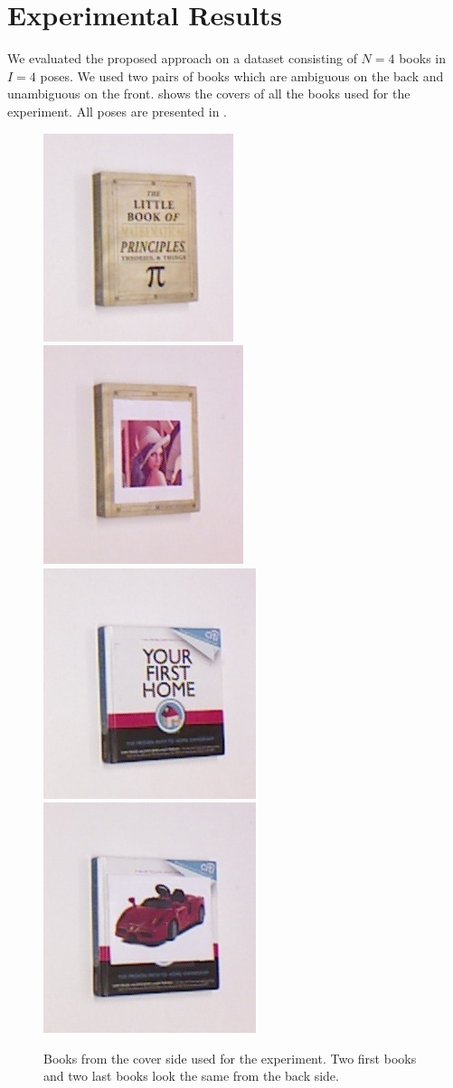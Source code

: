 
\section{Experimental Results}



    We evaluated the proposed approach on a dataset consisting of $N = 4$ books in $I = 4$ poses. We used two pairs of books which are ambiguous on the back and unambiguous on the front.  shows the covers of all the books used for the experiment. All poses are presented in . 
    
\begin{figure}
\centering
    		\includegraphics[height = 0.25\columnwidth]{pics/math_cover1_ok.jpg}
    		\includegraphics[height = 0.25\columnwidth]{pics/math_cover2_ok.jpg}
    		\includegraphics[height = 0.25\columnwidth]{pics/first_cover1.jpg}
    		\includegraphics[height = 0.25\columnwidth]{pics/first_cover2.jpg}
    		\caption{Books from the cover side used for the experiment. Two first books and two last books look the same from the back side.}
	\label{fig:object_dataset}
    \end{figure}     
    

